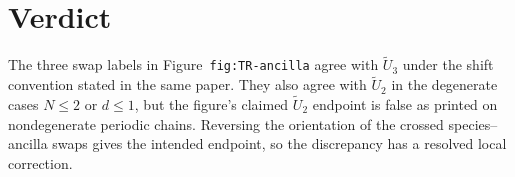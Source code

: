 \documentclass{article}
\begin{document}
\section{Verdict}

The three swap labels in Figure~\texttt{fig:TR-ancilla} agree with
$\widetilde U_3$ under the shift convention stated in the same paper. They
also agree with $\widetilde U_2$ in the degenerate cases $N\leq2$ or $d\leq1$,
but the figure's claimed $\widetilde U_2$ endpoint is false as printed on
nondegenerate periodic chains. Reversing the orientation of the crossed
species--ancilla swaps gives the intended endpoint, so the discrepancy has a
resolved local correction.



\end{document}
